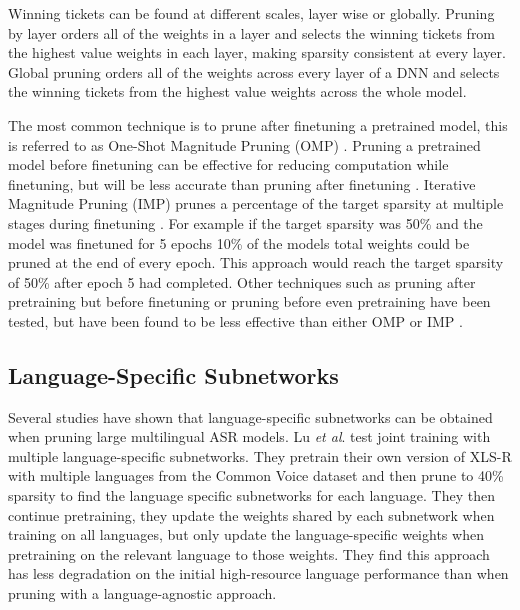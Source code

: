 Winning tickets can be found at different scales, layer wise or globally. Pruning by layer orders all of the weights in a layer and selects the winning tickets from the highest value weights in each layer, making sparsity consistent at every layer. Global pruning orders all of the weights across every layer of a DNN and selects the winning tickets from the highest value weights across the whole model. %

The most common technique is to prune after finetuning a pretrained model, this is referred to as One-Shot Magnitude Pruning (OMP) \cite{frankle2018LTH, PARP}. Pruning a pretrained model before finetuning can be effective for reducing computation while finetuning, but will be less accurate than pruning after finetuning \cite{PARP}. Iterative Magnitude Pruning (IMP) prunes a percentage of the target sparsity at multiple stages during finetuning \cite{frankle2018LTH}. For example if the target sparsity was 50\% and the model was finetuned for 5 epochs 10\% of the models total weights could be pruned at the end of every epoch. This approach would reach the target sparsity of 50\% after epoch 5 had completed. Other techniques such as pruning after pretraining but before finetuning or pruning before even pretraining have been tested, but have been found to be less effective than either OMP or IMP \cite{frankle2018LTH, liu2018rethinking, You2020Drawing, PARP}.

\subsection{Language-Specific Subnetworks}
Several studies have shown that language-specific subnetworks can be obtained when pruning large multilingual ASR models. Lu \textit{et al}. \cite{Lu_Language_adap_xlsr} test joint training with multiple language-specific subnetworks. They pretrain their own version of XLS-R with multiple languages from the Common Voice dataset \cite{ardila-etal-2020-common} and then prune to 40\% sparsity to find the language specific subnetworks for each language. They then continue pretraining, they update the weights shared by each subnetwork when training on all languages, but only update the language-specific weights when pretraining on the relevant language to those weights. They find this approach has less degradation on the initial high-resource language performance than when pruning with a language-agnostic approach. 

